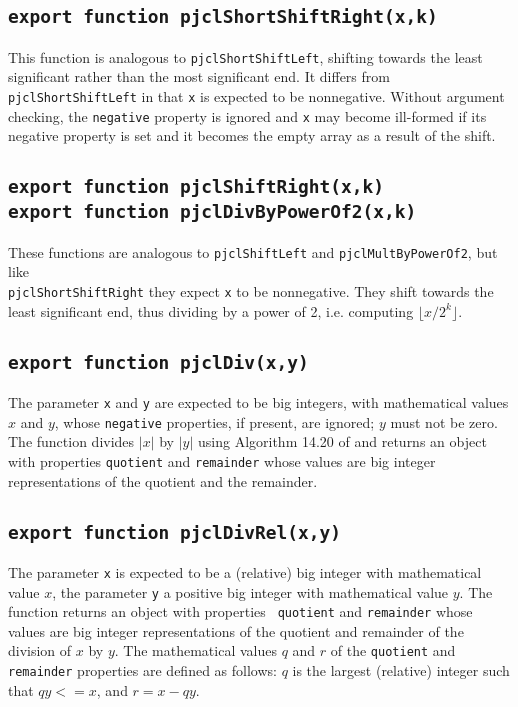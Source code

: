 \documentclass[12pt]{article}
\begin{document}
\subsection{\tt export function pjclShortShiftRight(x,k)}

This function is analogous to {\tt pjclShortShiftLeft}, shifting towards the least significant rather than the most significant end.  It differs from {\tt pjclShortShiftLeft} in that {\tt x} is expected to be nonnegative. Without argument checking, the {\tt negative} property is ignored and {\tt x} may become ill-formed if its negative property is set and it becomes the empty array as a result of the shift.

\subsection{\tt export function pjclShiftRight(x,k)\\export function pjclDivByPowerOf2(x,k)}

These functions are analogous to {\tt pjclShiftLeft} and {\tt pjclMultByPowerOf2}, 
but like\\
{\tt pjclShortShiftRight} they expect {\tt x} to be nonnegative.  They shift towards the least significant end, thus dividing by a power of 2, i.e. computing $\lfloor
x/2^k \rfloor$.

\subsection{\tt export function pjclDiv(x,y)}

The parameter {\tt x} and {\tt y} are expected to be big integers, with
mathematical values $x$ and $y$, whose {\tt negative} properties, if present, are
ignored; $y$ must not be zero.  The function divides $|x|$ by $|y|$ 
using Algorithm 14.20 of \cite{Menezes97handbookof} and returns an object with
properties {\tt quotient} and {\tt remainder} whose values are big
integer representations of the quotient and the remainder.

\subsection{\tt export function pjclDivRel(x,y)}

The parameter {\tt x} is expected to be a (relative) big integer with
mathematical value $x$, the parameter {\tt y} a positive big integer
with mathematical value $y$.  The function returns an object with properties {\tt
  quotient} and {\tt remainder} whose values are big integer
representations of the quotient and remainder of the division of $x$
by $y$.  The mathematical values $q$ and $r$ of the {\tt quotient} and
{\tt remainder} properties are defined as follows: $q$ is
the largest (relative) integer such that $qy <= x$, and $r = x - qy$.
\end{document}
